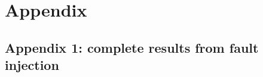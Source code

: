 \section{Appendix}

\subsection{Appendix 1: complete results from fault injection}
\begin{comment}
\begin{verbatim}[label=lst:injection_results]

Filename                        Average Difference From Control         Alternative Implementation Results
seidel-2d.float.txt             0.0                                     0.00010252590179347587
seidel-2d.txt                   0.00010252590179347587                  0.0
seidel-2d_bit_no_1.fixed.txt    0.00010252973353766834                  7.836499591601375e-15
seidel-2d_bit_no_1.float.txt    7.836499591601375e-15                   0.00010252973353766834
seidel-2d_bit_no_2.fixed.txt    0.00010242978918456464                  1.0070183402433041e-14
seidel-2d_bit_no_2.float.txt    1.0070183402433041e-14                  0.00010242978918456464
seidel-2d_bit_no_3.fixed.txt    0.00010269591987037501                  1.7122632695390493e-14
seidel-2d_bit_no_3.float.txt    1.7122632695390493e-14                  0.00010269591987037501
seidel-2d_bit_no_4.fixed.txt    0.00010227745091820854                  2.8727424627485174e-14
seidel-2d_bit_no_4.float.txt    2.8727424627485174e-14                  0.00010227745091820854
seidel-2d_bit_no_5.fixed.txt    0.00010277981877232038                  5.09567649902877e-14
seidel-2d_bit_no_5.float.txt    5.09567649902877e-14                    0.00010277981877232038
seidel-2d_bit_no_6.fixed.txt    0.00010250126707458161                  8.628055195216561e-14
seidel-2d_bit_no_6.float.txt    8.628055195216561e-14                   0.00010250126707458161
seidel-2d_bit_no_7.fixed.txt    0.00010450026309392104                  1.2886278998079994e-13
seidel-2d_bit_no_7.float.txt    1.2886278998079994e-13                  0.00010450026309392104
seidel-2d_bit_no_8.fixed.txt    0.00010662387752436846                  2.3631074870349154e-13
seidel-2d_bit_no_8.float.txt    2.3631074870349154e-13                  0.00010662387752436846
seidel-2d_bit_no_9.fixed.txt    9.194230723288186e-05                   4.625698030993539e-13
seidel-2d_bit_no_9.float.txt    4.625698030993539e-13                   9.194230723288186e-05

\end{comment}
